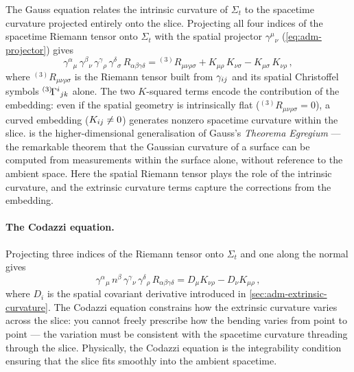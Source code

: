 The Gauss equation relates the intrinsic curvature of $\Sigma_t$ to the
spacetime curvature projected entirely onto the slice.  Projecting all four
indices of the spacetime Riemann tensor onto $\Sigma_t$ with the spatial
projector $\gamma^\mu{}_\nu$ (\cref{eq:adm-projector}) gives
%
\begin{equation}
  \gamma^\alpha{}_\mu\,\gamma^\beta{}_\nu\,
  \gamma^\gamma{}_\rho\,\gamma^\delta{}_\sigma\,
  R_{\alpha\beta\gamma\delta}
  = {}^{(3)}\!R_{\mu\nu\rho\sigma}
    + K_{\mu\rho}\,K_{\nu\sigma}
    - K_{\mu\sigma}\,K_{\nu\rho} \,,
  \label{eq:adm-gauss}
\end{equation}
%
where ${}^{(3)}\!R_{\mu\nu\rho\sigma}$ is the Riemann tensor built from
$\gamma_{ij}$ and its spatial Christoffel symbols
${}^{(3)}\!\Gamma^{i}{}_{j k}$ alone.  The two $K$-squared terms encode
the contribution of the embedding: even if the spatial geometry is
intrinsically flat (${}^{(3)}\!R_{\mu\nu\rho\sigma} = 0$), a curved
embedding ($K_{ij} \neq 0$) generates nonzero spacetime curvature
within the slice.   is the higher-dimensional
generalisation of Gauss's \emph{Theorema Egregium} --- the remarkable
theorem that the Gaussian curvature of a surface can be computed from
measurements within the surface alone, without reference to the ambient
space.  Here the spatial Riemann tensor plays the role of the intrinsic
curvature, and the extrinsic curvature terms capture the corrections from
the embedding.

\paragraph{The Codazzi equation.}

Projecting three indices of the Riemann tensor onto $\Sigma_t$ and one
along the normal gives
%
\begin{equation}
  \gamma^\alpha{}_\mu\,n^\beta\,
  \gamma^\gamma{}_\nu\,\gamma^\delta{}_\rho\,
  R_{\alpha\beta\gamma\delta}
  = D_\mu K_{\nu\rho} - D_\nu K_{\mu\rho} \,,
  \label{eq:adm-codazzi}
\end{equation}
%
where $D_i$ is the spatial covariant derivative introduced in
\cref{sec:adm-extrinsic-curvature}.  The Codazzi equation constrains how
the extrinsic curvature varies across the slice: you cannot freely
prescribe how the bending varies from point to point --- the variation must
be consistent with the spacetime curvature threading through the slice.
Physically, the Codazzi equation is the integrability condition ensuring
that the slice fits smoothly into the ambient spacetime.


